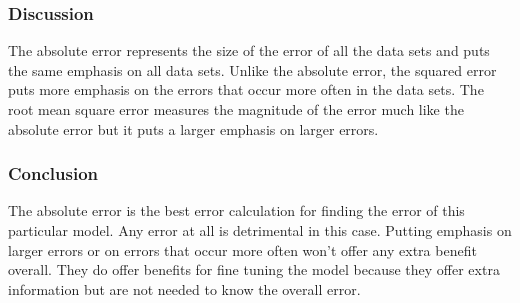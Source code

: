 		\subsubsection*{Discussion}
		
		The absolute error represents the size of the error of all the data sets and puts the same emphasis on all data sets. Unlike the absolute error, the squared error puts more emphasis on the errors that occur more often in the data sets. The root mean square error measures the magnitude of the error much like the absolute error but it puts a larger emphasis on larger errors.

		\subsubsection*{Conclusion}		

        The absolute error is the best error calculation for finding the error of this particular model. Any error at all is detrimental in this case. Putting emphasis on larger errors or on errors that occur more often won't offer any extra benefit overall. They do offer benefits for fine tuning the model because they offer extra information but are not needed to know the overall error.